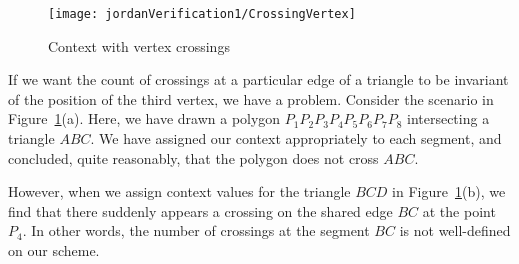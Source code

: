 \begin{figure}
\centering\texttt{[image: jordanVerification1/CrossingVertex]}
\caption{Context with vertex crossings}
\label{fig:CrossingVertex}
\end{figure}

If we want the count of crossings at a particular edge of a triangle to be invariant of the position of the third vertex, we have a problem. Consider the scenario in Figure~\ref{fig:CrossingVertex}(a). Here, we have drawn a polygon $P_1P_2P_3P_4P_5P_6P_7P_8$ intersecting a triangle $ABC$. We have assigned our context appropriately to each segment, and concluded, quite reasonably, that the polygon does not cross $ABC$. 

However, when we assign context values for the triangle $BCD$ in Figure~\ref{fig:CrossingVertex}(b), we find that there suddenly appears a crossing on the shared edge $BC$ at the point $P_4$. In other words, the number of crossings at the segment $BC$ is not well-defined on our scheme.






